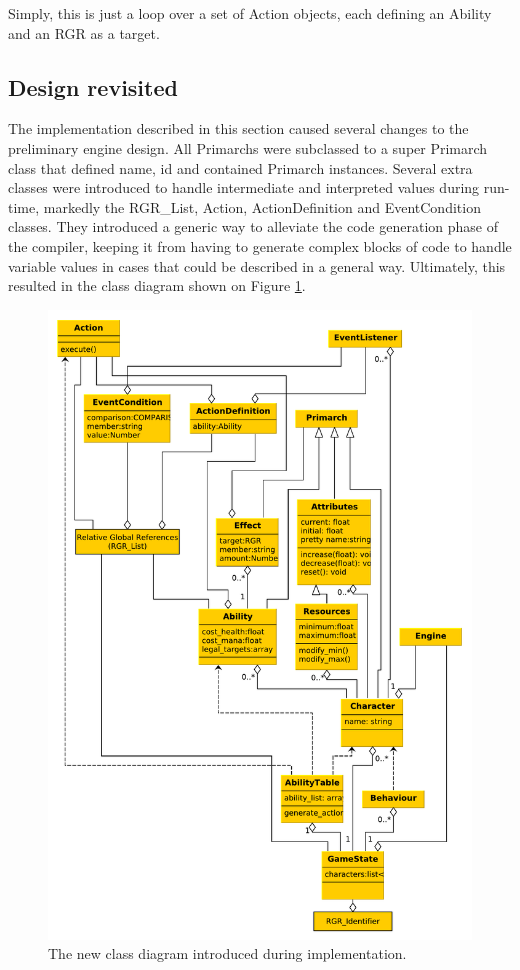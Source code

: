 Simply, this is just a loop over a set of Action objects, each defining an Ability and an RGR as a target.

\subsection{Design revisited}
The implementation described in this section caused several changes to the preliminary engine design. All Primarchs were subclassed to a super Primarch class that defined name, id and contained Primarch instances. Several extra classes were introduced to handle intermediate and interpreted values during run-time, markedly the RGR\_List, Action, ActionDefinition and EventCondition classes. They introduced a generic way to alleviate the code generation phase of the compiler, keeping it from having to generate complex blocks of code to handle variable values in cases that could be described in a general way. Ultimately, this resulted in the class diagram shown on Figure \ref{figure:engine:implementation:new-class-diagram}.

\begin{figure}
\includegraphics[width=\linewidth]{img/class_diagram_final}
\caption{\label{figure:engine:implementation:new-class-diagram}The new class diagram introduced during implementation.}
\end{figure}